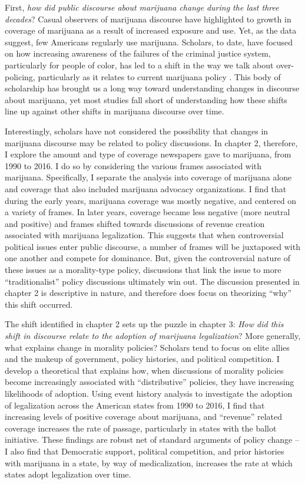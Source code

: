 First, \textit{how did public discourse about marijuana change during the last three decades}? Casual observers of marijuana discourse have highlighted to growth in coverage of marijuana as a result of increased exposure and use. Yet, as the data suggest, few Americans regularly use marijuana. Scholars, to date, have focused on how increasing awareness of the failures of the criminal justice system, particularly for people of color, has led to a shift in the way we talk about over-policing, particularly as it relates to current marijuana policy \citet{gottschalk_2016,sered_2019,alexander_2010,caulkins_et_al_2012,rosenthal_and_kubby_1996}. This body of scholarship has brought us a long way toward understanding changes in discourse about marijuana, yet most studies fall short of  understanding how these shifts line up against other shifts in marijuana discourse over time. 

Interestingly, scholars have not considered the possibility that changes in marijuana discourse may be related to policy discussions. In chapter 2, therefore, I explore the amount and type of coverage newspapers gave to marijuana, from 1990 to 2016. I do so by considering the various frames associated with marijuana. Specifically, I separate the analysis into coverage of marijuana alone and coverage that also included marijuana advocacy organizations. I find that during the early years, marijuana coverage was mostly negative, and centered on a variety of frames. In later years, coverage became less negative (more neutral and positive) and frames shifted towards discussions of revenue creation associated with marijuana legalization. This suggests that when controversial political issues enter public discourse, a number of frames will be juxtaposed with one another and compete for dominance. But, given the controversial nature of these issues as a morality-type policy, discussions that link the issue to more ``traditionalist'' policy discussions ultimately win out. The discussion presented in chapter 2 is descriptive in nature, and therefore does focus on theorizing ``why'' this shift occurred. 

The shift identified in chapter 2 sets up the puzzle in chapter 3: \textit{How did this shift in discourse relate to the adoption of marijuana legalization}? More generally, what explains change in morality policies? Scholars tend to focus on elite allies and the makeup of government, policy histories, and political competition. I develop a theoretical that explains how, when discussions of morality policies become increasingly associated with ``distributive'' policies, they have increasing likelihoods of adoption. Using event history analysis to investigate the adoption of legalization across the American states from 1990 to 2016, I find that increasing levels of positive coverage about marijuana, and ``revenue'' related coverage increases the rate of passage, particularly in states with the ballot initiative. These findings are robust net of standard arguments of policy change -- I also find that Democratic support, political competition, and prior histories with marijuana in a state, by way of medicalization, increases the rate at which states adopt legalization over time. 

